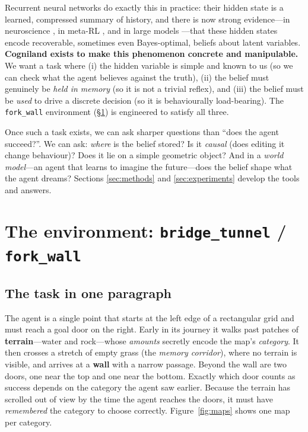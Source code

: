 \documentclass[11pt]{article}
\newcommand{\code}[1]{\texttt{\small #1}}
\begin{document}
Recurrent neural networks do exactly this in practice: their hidden state is a
learned, compressed summary of history, and there is now strong evidence---in
neuroscience \cite{mante2013context,wong2006recurrent,sussillo2013opening}, in
meta-RL \cite{mikulik2020meta,lambrechts2022recurrent}, and in large models
\cite{li2023othello,shai2024transformers}---that these hidden states encode
recoverable, sometimes even Bayes-optimal, beliefs about latent variables.
\textbf{Cogniland exists to make this phenomenon concrete and manipulable.} We
want a task where (i) the hidden variable is simple and known to us (so we can
check what the agent believes against the truth), (ii) the belief must genuinely
be \emph{held in memory} (so it is not a trivial reflex), and (iii) the belief
must be \emph{used} to drive a discrete decision (so it is behaviourally
load-bearing). The \code{fork\_wall} environment (\S\ref{sec:env}) is engineered
to satisfy all three.

Once such a task exists, we can ask sharper questions than ``does the agent
succeed?''. We can ask: \emph{where} is the belief stored? Is it \emph{causal}
(does editing it change behaviour)? Does it lie on a simple geometric object?
And in a \emph{world model}---an agent that learns to imagine the future---does
the belief shape what the agent dreams? Sections \ref{sec:methods} and
\ref{sec:experiments} develop the tools and answers.

\section{The environment: \code{bridge\_tunnel} / \code{fork\_wall}}
\label{sec:env}

\subsection{The task in one paragraph}
The agent is a single point that starts at the left edge of a rectangular grid
and must reach a goal door on the right. Early in its journey it walks past
patches of \textbf{terrain}---water and rock---whose \emph{amounts} secretly
encode the map's \emph{category}. It then crosses a stretch of empty grass (the
\emph{memory corridor}), where no terrain is visible, and arrives at a
\textbf{wall} with a narrow passage. Beyond the wall are two doors, one near the
top and one near the bottom. Exactly which door counts as success depends on the
category the agent saw earlier. Because the terrain has scrolled out of view by
the time the agent reaches the doors, it must have \emph{remembered} the
category to choose correctly. Figure~\ref{fig:maps} shows one map per category.
\end{document}
